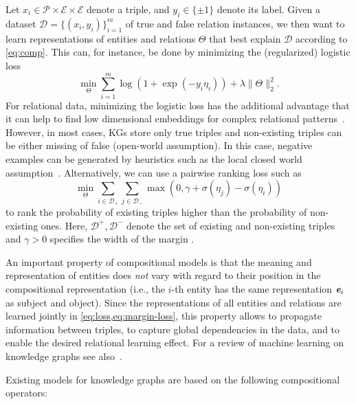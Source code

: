 \documentclass[letterpaper]{article}
\renewcommand{\vec}[1]{\textit{\textbf{#1}}}
\newcommand{\ve}{\vec{e}}
\newcommand{\Set}[1]{\mathcal{#1}}
\newcommand{\SE}{\Set{E}}
\begin{document}
Let ${x_i \in \Set{P} \times \SE \times \SE}$ denote a triple, and
${y_i \in \{\pm1\}}$ denote its label.
Given a dataset ${\Set{D} = \{(x_i, y_i)\}_{i=1}^m}$ of true and false relation
instances, we then want to learn representations of entities and relations
$\Theta$ that best explain $\Set{D}$ according to \cref{eq:comp}. This can, for instance, be
done by minimizing the (regularized) logistic loss
\begin{equation}
  \label{eq:loss}
  \min_{\Theta} \sum_{i=1}^m \log(1 + \exp(-y_i \eta_i)) + \lambda \|\Theta\|_2^2 .
\end{equation}
For relational data, minimizing the logistic loss has the additional advantage
that it can help to find low dimensional embeddings for complex relational
patterns~\citep{bouchard2015approximate}.
However, in most cases, KGs store only true triples and non-existing
triples can be either missing of false (open-world
assumption). In this case, negative examples can be generated by heuristics
such as the local closed world assumption~\citep{dong2014knowledge}.
Alternatively, we can use a pairwise ranking loss such as 
\begin{equation}
  \label{eq:margin-loss}
  \min_{\Theta} \sum_{i \in \Set{D}_+} \sum_{j \in \Set{D}_{-}} \max(0, \gamma + \sigma(\eta_j) - \sigma(\eta_i))
\end{equation}
to rank the probability of existing triples higher than 
the probability of non-existing ones. Here,  
$\Set{D}^+, \Set{D}^-$ denote the set of existing and non-existing
triples and $\gamma > 0$ specifies the width of the margin \citep{bordes_learning_2011}.

An important property of compositional models is that the meaning and
representation of entities does \emph{not} vary with regard to their position in
the compositional representation (i.e., the $i$-th entity has the same
representation $\ve_i$ as subject and object). Since the representations of all
entities and relations are learned jointly in \cref{eq:loss,eq:margin-loss},
this property allows to propagate information between triples, to capture
global dependencies in the data, and to enable the desired relational learning
effect. 
For a review of machine learning on knowledge graphs
see also~\citet{nickel2015review}.


Existing models for knowledge graphs are based on the following compositional
operators:
\end{document}
